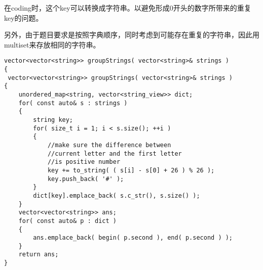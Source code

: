 在coding时，这个key可以转换成字符串。以避免形成0开头的数字所带来的重复key的问题。

另外，由于题目要求是按照字典顺序，同时考虑到可能存在重复的字符串，因此用multiset来存放相同的字符串。

\setcounter{lstlisting}{0}
\begin{lstlisting}[style=customc, caption={Unique Distance}]
vector<vector<string>> groupStrings( vector<string>& strings )
{
 vector<vector<string>> groupStrings( vector<string>& strings )
{
    unordered_map<string, vector<string_view>> dict;
    for( const auto& s : strings )
    {
        string key;
        for( size_t i = 1; i < s.size(); ++i )
        {
            //make sure the difference between
            //current letter and the first letter
            //is positive number
            key += to_string( ( s[i] - s[0] + 26 ) % 26 );
            key.push_back( '#' );
        }
        dict[key].emplace_back( s.c_str(), s.size() );
    }
    vector<vector<string>> ans;
    for( const auto& p : dict )
    {
        ans.emplace_back( begin( p.second ), end( p.second ) );
    }
    return ans;
}
\end{lstlisting}